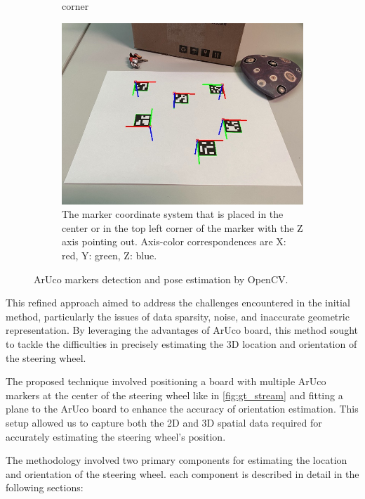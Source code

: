 \begin{figure}[htpb]
\begin{subfigure}[t]{0.3\textwidth}
{        corner}
        \label{fig:marker_detection}
    \end{subfigure}\hfill
    \begin{subfigure}[t]{0.3\textwidth}
        \centering
        \includegraphics[width=\textwidth]{media/chapter 5/singlemarkersaxes.jpg}
        \caption{The marker coordinate system that is placed in the center or in the top left 
        corner of the marker with the Z axis pointing out. 
        Axis-color correspondences are X: red, Y: green, Z: blue.}
        \label{fig:marker_orientation}
    \end{subfigure}
    \caption{ArUco markers detection and pose estimation by OpenCV.}
\end{figure}

This refined approach aimed to address the challenges 
encountered in the initial method, particularly the issues of 
data sparsity, noise, and inaccurate geometric representation. 
By leveraging the advantages of ArUco board, this method 
sought to tackle the difficulties in precisely estimating the 
3D location and orientation of the steering wheel. 

The proposed technique involved positioning a board with 
multiple ArUco markers at the center of the steering wheel 
like in \cref{fig:gt_stream} and fitting a plane to the ArUco board to 
enhance the accuracy of orientation estimation. 
This setup allowed us to capture both the 2D and 3D spatial data required for accurately estimating the steering wheel's position.

The methodology involved two primary components for estimating 
the location and orientation of the steering wheel. 
each component is described in detail in the following 
sections:

